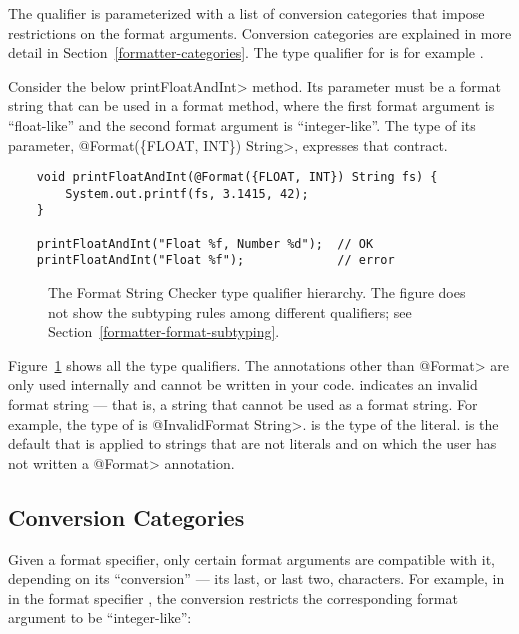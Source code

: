 The  qualifier is parameterized with
a list of conversion categories that impose restrictions on the format arguments.
Conversion categories are explained in more detail in
Section~\ref{formatter-categories}.  The type qualifier for  is
for example .

Consider the below \<printFloatAndInt> method.  Its parameter must be a
format string that can be used in a format method, where the first format
argument is ``float-like'' and the second format argument is
``integer-like''.  The type of its parameter, \<@Format(\{FLOAT, INT\})
String>, expresses that contract.

\begin{Verbatim}
    void printFloatAndInt(@Format({FLOAT, INT}) String fs) {
        System.out.printf(fs, 3.1415, 42);
    } 

    printFloatAndInt("Float %f, Number %d");  // OK
    printFloatAndInt("Float %f");             // error
\end{Verbatim}

\begin{figure}
\caption{The Format String Checker type qualifier hierarchy.  The figure
  does not show the subtyping rules among different 
  qualifiers; see Section~\ref{formatter-format-subtyping}.}
\label{fig-formatter-hierarchy}
\end{figure}

Figure~\ref{fig-formatter-hierarchy} shows all the type qualifiers.
The annotations other than \<@Format> are only used
internally and cannot be written in your code.
 indicates an invalid format
string --- that is, a string that cannot be used as a format string.  For
example, the type of  is \<@InvalidFormat String>.
 is the type of the
 literal.
 is the default that is
applied to strings that are not literals and on which the user has not
written a \<@Format> annotation.

\subsection{Conversion Categories\label{formatter-categories}}

Given a format specifier, only certain format arguments are compatible with
it, depending on its ``conversion'' --- its last, or last two,
characters.  For example, in in the format specifier , the
conversion  restricts the corresponding format argument
to be ``integer-like'':

